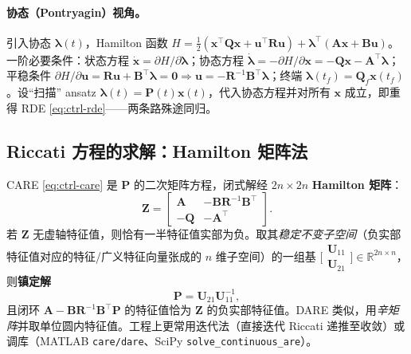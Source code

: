 \paragraph{协态（Pontryagin）视角。}
 引入协态 $\boldsymbol{\lambda}(t)$，Hamilton 函数 $H=\tfrac12(\mathbf{x}^\top\mathbf{Q}\mathbf{x}+\mathbf{u}^\top\mathbf{R}\mathbf{u})+\boldsymbol{\lambda}^\top(\mathbf{A}\mathbf{x}+\mathbf{B}\mathbf{u})$。一阶必要条件：状态方程 $\dot{\mathbf{x}}=\partial H/\partial\boldsymbol{\lambda}$；协态方程 $\dot{\boldsymbol{\lambda}}=-\partial H/\partial\mathbf{x}=-\mathbf{Q}\mathbf{x}-\mathbf{A}^\top\boldsymbol{\lambda}$；平稳条件 $\partial H/\partial\mathbf{u}=\mathbf{R}\mathbf{u}+\mathbf{B}^\top\boldsymbol{\lambda}=\mathbf{0}\Rightarrow\mathbf{u}=-\mathbf{R}^{-1}\mathbf{B}^\top\boldsymbol{\lambda}$；终端 $\boldsymbol{\lambda}(t_f)=\mathbf{Q}_f\mathbf{x}(t_f)$。设“扫描” ansatz $\boldsymbol{\lambda}(t)=\mathbf{P}(t)\mathbf{x}(t)$，代入协态方程并对所有 $\mathbf{x}$ 成立，即重得 RDE \cref{eq:ctrl-rde}——两条路殊途同归。

\subsection{Riccati 方程的求解：Hamilton 矩阵法}
\label{sec:ctrl-riccati-solve}

CARE \cref{eq:ctrl-care} 是 $\mathbf{P}$ 的二次矩阵方程，闭式解经 $2n\times2n$ \textbf{Hamilton 矩阵}\cite{rawlings2020mpc}：
\begin{equation}
  \mathbf{Z}=\begin{bmatrix}\mathbf{A}&-\mathbf{B}\mathbf{R}^{-1}\mathbf{B}^\top\\-\mathbf{Q}&-\mathbf{A}^\top\end{bmatrix}.
  \label{eq:ctrl-hamilton}
\end{equation}
若 $\mathbf{Z}$ 无虚轴特征值，则恰有一半特征值实部为负。取其\emph{稳定不变子空间}（负实部特征值对应的特征/广义特征向量张成的 $n$ 维子空间）的一组基 $\big[\begin{smallmatrix}\mathbf{U}_{11}\\\mathbf{U}_{21}\end{smallmatrix}\big]\in\mathbb{R}^{2n\times n}$，则\textbf{镇定解}
\begin{equation}
  \mathbf{P}=\mathbf{U}_{21}\mathbf{U}_{11}^{-1},
  \label{eq:ctrl-hamilton-sol}
\end{equation}
且闭环 $\mathbf{A}-\mathbf{B}\mathbf{R}^{-1}\mathbf{B}^\top\mathbf{P}$ 的特征值恰为 $\mathbf{Z}$ 的负实部特征值。DARE 类似，用\emph{辛矩阵}并取单位圆内特征值。工程上更常用迭代法（直接迭代 Riccati 递推至收敛）或调库（MATLAB \texttt{care/dare}、SciPy \texttt{solve\_continuous\_are}）。

